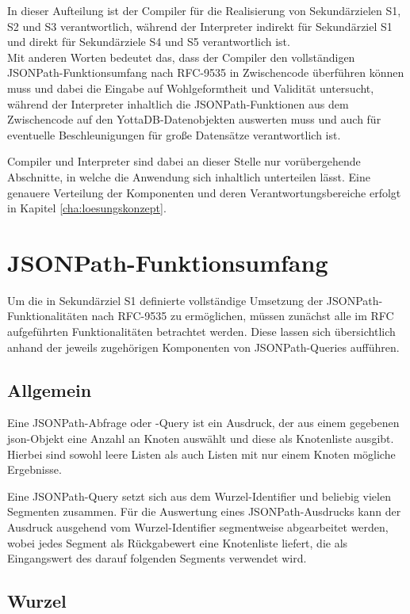 \documentclass[oneside]{ausarbeitung}
\begin{document}
In dieser Aufteilung ist der Compiler für die Realisierung von Sekundärzielen S1, S2 und S3 verantwortlich, während der Interpreter indirekt für Sekundärziel S1 und direkt für Sekundärziele S4 und S5 verantwortlich ist. \\
Mit anderen Worten bedeutet das, dass der Compiler den vollständigen JSONPath-Funktionsumfang nach RFC-9535 in Zwischencode überführen können muss und dabei die Eingabe auf Wohlgeformtheit und Validität untersucht, während der Interpreter inhaltlich die JSONPath-Funktionen aus dem Zwischencode auf den YottaDB-Datenobjekten auswerten muss und auch für eventuelle Beschleunigungen für große Datensätze verantwortlich ist.
	
Compiler und Interpreter sind dabei an dieser Stelle nur vorübergehende Abschnitte, in welche die Anwendung sich inhaltlich unterteilen lässt. Eine genauere Verteilung der Komponenten und deren Verantwortungsbereiche erfolgt in Kapitel \ref{cha:loesungskonzept}.
	

\pagebreak
	
\section{JSONPath-Funktionsumfang}
Um die in Sekundärziel S1 definierte vollständige Umsetzung der JSONPath-Funktionalitäten nach RFC-9535 \cite{Gössner:jsonpath} zu ermöglichen, müssen zunächst alle im RFC aufgeführten Funktionalitäten betrachtet werden. Diese lassen sich übersichtlich anhand der jeweils zugehörigen Komponenten von JSONPath-Queries aufführen.
	
\subsection{Allgemein}
	
Eine JSONPath-Abfrage oder -Query ist ein Ausdruck, der aus einem gegebenen \ac{json}-Objekt eine Anzahl an Knoten auswählt und diese als Knotenliste ausgibt. Hierbei sind sowohl leere Listen als auch Listen mit nur einem Knoten mögliche Ergebnisse.
	
Eine JSONPath-Query setzt sich aus dem Wurzel-Identifier und beliebig vielen Segmenten zusammen. Für die Auswertung eines JSONPath-Ausdrucks kann der Ausdruck ausgehend vom Wurzel-Identifier segmentweise abgearbeitet werden, wobei jedes Segment als Rückgabewert eine Knotenliste liefert, die als Eingangswert des darauf folgenden Segments verwendet wird. 

	
\subsection{Wurzel}
	
\end{document}
